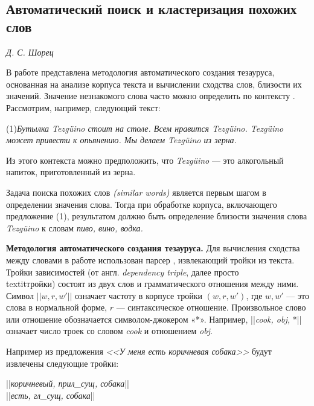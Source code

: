 \documentclass{article}
\begin{document}
\begin{articletext}
\section{Автоматический поиск и кластеризация похожих слов}

\begin{flushright}
\textit{Д. С. Шорец} 
\end{flushright}

В работе \cite{Dekang 1998} представлена методология автоматического создания тезауруса, основанная на анализе корпуса текста и вычислении сходства слов, близости их значений. Значение незнакомого слова часто можно определить по контексту \cite{Eugene 1975}.  Рассмотрим, например, следующий текст:
\begin{flushright}
(1)\textit{Бутылка Tezg\"uino стоит на столе. Всем нравится Tezg\"uino. Tezg\"uino может привести к опьянению. Мы делаем Tezg\"uino из зерна.} 
\end{flushright}

Из этого контекста можно предположить, что \textit{Tezg\"uino} --- это алкогольный напиток, приготовленный из зерна.

Задача поиска похожих слов \textit{(similar words)} является первым шагом в определении значения слова. Тогда при обработке корпуса, включающего предложение (1), результатом должно быть определение близости значения слова \textit{Tezg\"uino} к словам \textit{пиво, вино, водка.}

\textbf{Методология автоматического создания тезауруса.} Для вычисления сходства между словами в работе \cite{Dekang 1998} использован парсер \cite{Dekang 1993}, извлекающий тройки из текста. Тройки зависимостей (от англ. \textit{dependency triple}, далее просто \\textit{тройки}) состоят из двух слов и грамматического отношения между ними. Символ $||w, r, w'||$ означает частоту в корпусе тройки $(w, r, w')$, где $w, w'$ --- это слова в нормальной форме, $r$ --- синтаксическое отношение. Произвольное слово или отношение обозначается символом-джокером «*». Например, ||\textit{cook, obj,} *|| означает число троек со словом \textit{cook} и отношением \textit{obj}. 

Например из предложения \textit{<<У меня есть коричневая собака>>} будут извлечены следующие тройки:

\begin{center}
||\textit{коричневый, прил\_сущ, собака}||\\
||\textit{есть, гл\_сущ, собака}|| 
\end{center}


\end{articletext}
\end{document}
